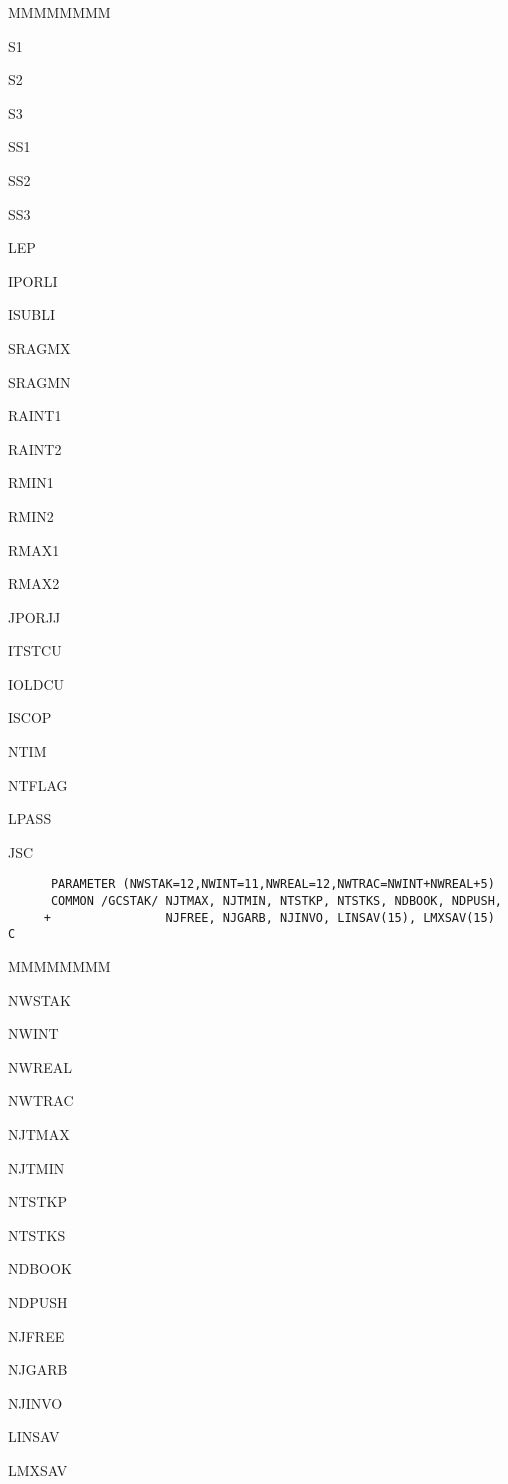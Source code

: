 \begin{DLtt}{MMMMMMMM}
\item[S1]
\item[S2]
\item[S3]
\item[SS1]
\item[SS2]
\item[SS3]
\item[LEP]
\item[IPORLI]
\item[ISUBLI]
\item[SRAGMX]
\item[SRAGMN]
\item[RAINT1]
\item[RAINT2]
\item[RMIN1]
\item[RMIN2]
\item[RMAX1]
\item[RMAX2]
\item[JPORJJ]
\item[ITSTCU]
\item[IOLDCU]
\item[ISCOP]
\item[NTIM]
\item[NTFLAG]
\item[LPASS]
\item[JSC]
\end{DLtt}
\begin{verbatim}
      PARAMETER (NWSTAK=12,NWINT=11,NWREAL=12,NWTRAC=NWINT+NWREAL+5)
      COMMON /GCSTAK/ NJTMAX, NJTMIN, NTSTKP, NTSTKS, NDBOOK, NDPUSH,
     +                NJFREE, NJGARB, NJINVO, LINSAV(15), LMXSAV(15)
C
\end{verbatim}
\begin{DLtt}{MMMMMMMM}
\item[NWSTAK]
\item[NWINT]
\item[NWREAL]
\item[NWTRAC]
\item[NJTMAX]
\item[NJTMIN]
\item[NTSTKP]
\item[NTSTKS]
\item[NDBOOK]
\item[NDPUSH]
\item[NJFREE]
\item[NJGARB]
\item[NJINVO]
\item[LINSAV]
\item[LMXSAV]
\end{DLtt}
